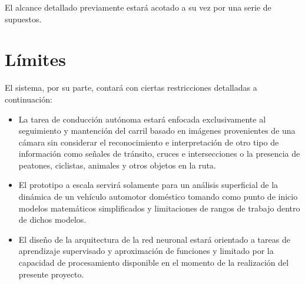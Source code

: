 El alcance detallado previamente estará acotado a su vez por una serie de supuestos.

\section{Límites}
El sistema, por su parte, contará con ciertas restricciones detalladas a 
continuación:
\begin{itemize}
    \item La tarea de conducción autónoma estará enfocada exclusivamente al 
    seguimiento y mantención del carril basado en imágenes provenientes de una cámara 
    sin considerar el reconocimiento e interpretación de otro tipo de información como 
    señales de tránsito, cruces e intersecciones o la presencia de peatones, ciclistas, 
    animales y otros objetos en la ruta.
    \item El prototipo a escala servirá solamente para un análisis superficial 
    de la dinámica de un vehículo automotor doméstico tomando como punto 
    de inicio modelos matemáticos simplificados y limitaciones de rangos de trabajo dentro 
    de dichos modelos.
    \item El diseño de la arquitectura de la red neuronal estará orientado a 
    tareas de aprendizaje supervisado y aproximación de funciones y limitado por la capacidad de 
    procesamiento disponible en el momento de la realización del presente proyecto.
\end{itemize}
